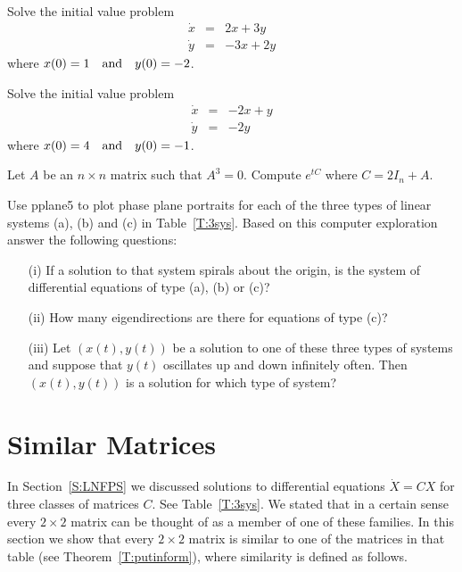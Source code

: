\EXER

\TEXER

\begin{exercise} \label{c6.3.1}
Solve the initial value problem
\[
\begin{array}{rcr}
\dot{x} & = & 2x + 3y \\
\dot{y} & = & -3x + 2y
\end{array}
\]
where $x(0) = 1  \quad\mbox{and}\quad  y(0) = -2$.
\end{exercise}

\begin{exercise} \label{c6.3.2}
Solve the initial value problem
\[
\begin{array}{rcr}
\dot{x} & = & -2x + y \\
\dot{y} & = & -2y
\end{array}
\]
where $x(0) = 4  \quad\mbox{and}\quad y(0) = -1$.
\end{exercise}

\begin{exercise} \label{c6.3.25}
Let $A$ be an $n\times n$ matrix such that $A^3=0$.  Compute $e^{tC}$
where $C=2I_n+A$.
\end{exercise}

\CEXER

\begin{exercise} \label{c6.3.3}
Use {\sf pplane5} to plot phase plane portraits for each of the
three types of linear systems (a), (b) and (c) in Table~\ref{T:3sys}.
Based on this computer exploration answer the following questions:
\begin{itemize}
\item[(i)]  If a solution to that system spirals about the origin,
is the system of differential equations of type (a), (b) or (c)?
\item[(ii)]  How many eigendirections are there for equations of type (c)?
\item[(iii)]  Let $(x(t),y(t))$ be a solution to one of these three types of
systems and suppose that $y(t)$ oscillates up and down infinitely often.
Then $(x(t),y(t))$ is a solution for which type of system?
\end{itemize}
\end{exercise}



\section{Similar Matrices} \label{S:6.5}

In Section~\ref{S:LNFPS} we discussed solutions to differential equations
$\dot{X}=CX$ for three classes of matrices $C$.  See Table~\ref{T:3sys}.
We stated that in a certain sense every $2\times 2$ matrix can be
thought of as a member of one of these families.  In this section we
show that every $2\times 2$ matrix is similar to one of the matrices in that
table (see Theorem~\ref{T:putinform}), where similarity is defined as follows.

